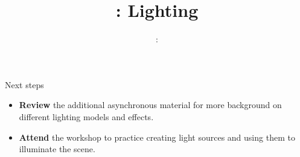 \usepackage{../../beamerthemeFalmouthGamesAcademy}
\usepackage{multimedia}
\graphicspath{ {../../} }




\usepackage[normalem]{ulem}
\usepackage{wasysym}

\usepackage{pdfpages}

\usepackage{caption}
\captionsetup[figure]{font=scriptsize,labelfont=scriptsize}

\usetikzlibrary{arrows,automata}




\title{\sessionnumber: Lighting}
\subtitle{\modulecode: \moduletitle}

\frame{\titlepage} 






\begin{frame}{Next steps}
	\begin{itemize}
		\item \textbf{Review} the additional asynchronous material for more background on different lighting models and effects.
		\item \textbf{Attend} the workshop to practice creating light sources and using them to illuminate the scene.
	\end{itemize}
\end{frame}



